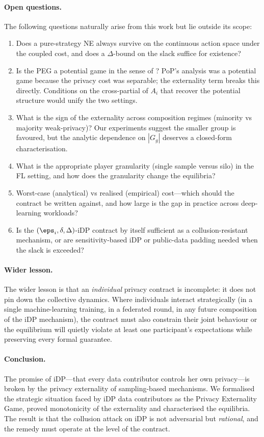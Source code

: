 \paragraph{Open questions.} The following questions naturally arise from
this work but lie outside its scope:
\begin{enumerate}
\item Does a pure-strategy NE always survive on the continuous action space
under the coupled cost, and does a $\Delta$-bound on the slack suffice for
existence?
\item Is the PEG a potential game in the sense of \cite{monderer1996potential}?
PoP's analysis was a potential game because the privacy cost was
separable; the externality term breaks this directly. Conditions on the
cross-partial of $A_i$ that recover the potential structure would unify
the two settings.
\item What is the sign of the externality across composition regimes
(minority vs majority weak-privacy)? Our experiments suggest the smaller
group is favoured, but the analytic dependence on $|G_g|$ deserves a
closed-form characterisation.
\item What is the appropriate player granularity (single sample versus
silo) in the FL setting, and how does the granularity change the
equilibria?
\item Worst-case (analytical) vs realised (empirical) cost---which should
the contract be written against, and how large is the gap in practice
across deep-learning workloads?
\item Is the $(\eps_i, \delta, \Delta)$-iDP contract by itself sufficient
as a collusion-resistant mechanism, or are sensitivity-based iDP or
public-data padding needed when the slack is exceeded?
\end{enumerate}

\paragraph{Wider lesson.} The wider lesson is that an \emph{individual}
privacy contract is incomplete: it does not pin down the collective
dynamics. Where individuals interact strategically (in a single
machine-learning training, in a federated round, in any future composition
of the iDP mechanism), the contract must also constrain their joint
behaviour or the equilibrium will quietly violate at least one
participant's expectations while preserving every formal guarantee.

\paragraph{Conclusion.} The promise of iDP---that every data contributor
controls her own privacy---is broken by the privacy externality of
sampling-based mechanisms. We formalised the strategic situation faced by
iDP data contributors as the Privacy Externality Game, proved monotonicity
of the externality and characterised the equilibria. The result is that
the collusion attack on iDP is not adversarial but \emph{rational}, and the
remedy must operate at the level of the contract.
